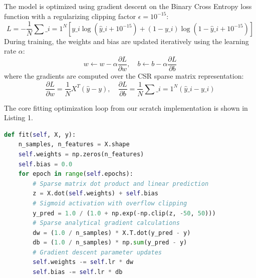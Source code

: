 \documentclass[12pt,a4paper]{article}
\begin{document}
The model is optimized using gradient descent on the Binary Cross Entropy loss function with a regularizing clipping factor $\epsilon = 10^{-15}$:
\[
L = -\frac{1}{N} \sum\_{i=1}^{N} \left[ y\_i \log(\hat{y}\_i + 10^{-15}) + (1 - y\_i) \log(1 - \hat{y}\_i + 10^{-15}) \right]
\]
During training, the weights and bias are updated iteratively using the learning rate $\alpha$:
\[
w \leftarrow w - \alpha \frac{\partial L}{\partial w}, \quad b \leftarrow b - \alpha \frac{\partial L}{\partial b}
\]
where the gradients are computed over the CSR sparse matrix representation:
\[
\frac{\partial L}{\partial w} = \frac{1}{N} X^T (\hat{y} - y), \quad \frac{\partial L}{\partial b} = \frac{1}{N} \sum\_{i=1}^{N} (\hat{y}\_i - y\_i)
\]

The core fitting optimization loop from our scratch implementation is shown in Listing 1.
\begin{lstlisting}[language=Python, caption=Logistic Regression Scratch Core Fitting Loop]
def fit(self, X, y):
    n_samples, n_features = X.shape
    self.weights = np.zeros(n_features)
    self.bias = 0.0
    for epoch in range(self.epochs):
        # Sparse matrix dot product and linear prediction
        z = X.dot(self.weights) + self.bias
        # Sigmoid activation with overflow clipping
        y_pred = 1.0 / (1.0 + np.exp(-np.clip(z, -50, 50)))
        # Sparse analytical gradient calculations
        dw = (1.0 / n_samples) * X.T.dot(y_pred - y)
        db = (1.0 / n_samples) * np.sum(y_pred - y)
        # Gradient descent parameter updates
        self.weights -= self.lr * dw
        self.bias -= self.lr * db
\end{lstlisting}
\end{document}
